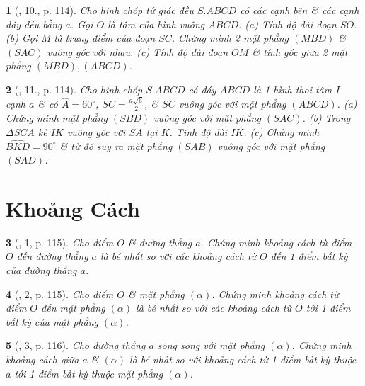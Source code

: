 \documentclass{article}
\newtheorem{baitoan}{}
\begin{document}
\begin{baitoan}[\cite{SGK_Toan_11_hinh_hoc_co_ban}, 10., p. 114]
	Cho hình chóp tứ giác đều $S.ABCD$ có các cạnh bên \& các cạnh đáy đều bằng $a$. Gọi $O$ là tâm của hình vuông $ABCD$. (a) Tính độ dài đoạn $SO$. (b) Gọi $M$ là trung điểm của đoạn $SC$. Chứng minh 2 mặt phẳng $(MBD)$ \& $(SAC)$ vuông góc với nhau. (c) Tính độ dài đoạn $OM$ \& tính góc giữa 2 mặt phẳng $(MBD),(ABCD)$.
\end{baitoan}

\begin{baitoan}[\cite{SGK_Toan_11_hinh_hoc_co_ban}, 11., p. 114]
	Cho hình chóp $S.ABCD$ có đáy $ABCD$ là 1 hình thoi tâm $I$ cạnh $a$ \& có $\widehat{A} = 60^\circ$, $SC = \frac{a\sqrt{6}}{2}$, \& $SC$ vuông góc với mặt phẳng $(ABCD)$. (a) Chứng minh mặt phẳng $(SBD)$ vuông góc với mặt phẳng $(SAC)$. (b) Trong $\Delta SCA$ kẻ $IK$ vuông góc với $SA$ tại $K$. Tính độ dài $IK$. (c) Chứng minh $\widehat{BKD} = 90^\circ$ \& từ đó suy ra mặt phẳng $(SAB)$ vuông góc với mặt phẳng $(SAD)$.
\end{baitoan}


\section{Khoảng Cách}

\begin{baitoan}[\cite{SGK_Toan_11_hinh_hoc_co_ban}, 1, p. 115]
	Cho điểm $O$ \& đường thẳng $a$. Chứng minh khoảng cách từ điểm $O$ đến đường thẳng $a$ là bé nhất so với các khoảng cách từ $O$ đến 1 điểm bất kỳ của đường thẳng $a$.
\end{baitoan}

\begin{baitoan}[\cite{SGK_Toan_11_hinh_hoc_co_ban}, 2, p. 115]
	Cho điểm $O$ \& mặt phẳng $(\alpha)$. Chứng minh khoảng cách từ điểm $O$ đến mặt phẳng $(\alpha)$ là bé nhất so với các khoảng cách từ $O$ tới 1 điểm bất kỳ của mặt phẳng $(\alpha)$.
\end{baitoan}

\begin{baitoan}[\cite{SGK_Toan_11_hinh_hoc_co_ban}, 3, p. 116]
	Cho đường thẳng $a$ song song với mặt phẳng $(\alpha)$. Chứng minh khoảng cách giữa $a$ \& $(\alpha)$ là bé nhất so với khoảng cách từ 1 điểm bất kỳ thuộc $a$ tới 1 điểm bất kỳ thuộc mặt phẳng $(\alpha)$.
\end{baitoan}
\end{document}
